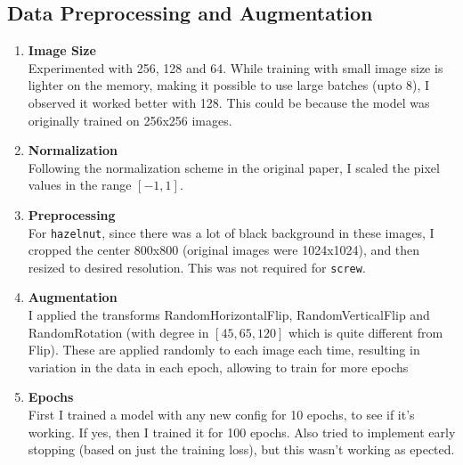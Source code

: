 \documentclass[]{article}
\begin{document}
\subsection{Data Preprocessing and Augmentation}
\begin{enumerate}
	\item \textbf{Image Size}\\
	Experimented with 256, 128 and 64. While training with small image size is lighter on the memory, making it possible to use large batches (upto 8), I observed it worked better with 128. This could be because the model was originally trained on 256x256 images. 
	\item \textbf{Normalization}\\
	Following the normalization scheme in the original paper, I scaled the pixel values in the range $[-1,1]$.
	\item \textbf{Preprocessing}\\
	For \texttt{hazelnut}, since there was a lot of black background in these images, I cropped the center 800x800 (original images were 1024x1024), and then resized to desired resolution. This was not required for \texttt{screw}.
	\item \textbf{Augmentation}\\
	I applied the transforms RandomHorizontalFlip, RandomVerticalFlip and RandomRotation (with degree in $[45,65,120]$ which is quite different from Flip). These are applied randomly to each image each time, resulting in variation in the data in each epoch, allowing to train for more epochs
	\item \textbf{Epochs}\\
	First I trained a model with any new config for 10 epochs, to see if it's working. If yes, then I trained it for 100 epochs. Also tried to implement early stopping (based on just the training loss), but this wasn't working as epected. 
\end{enumerate}
\end{document}
